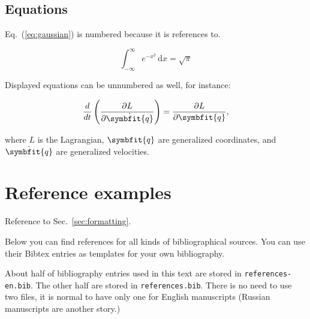 \documentclass[eqsecnum,authorsinfo]{kioj6}
\begin{document}
    \subsection{Equations}

    Eq.~(\ref{eq:gaussian}) is numbered because it is references to.
    
    \begin{equation}
        \int_{-\infty}^{\infty} e^{-x^2} \, \mathrm{d}x = \sqrt{\pi}
        \label{eq:gaussian}
    \end{equation}
    
    Displayed equations can be unnumbered as well, for instance:

    $$\frac{d}{dt} \left( \frac{\partial L}{\partial \dot{\symbfit{q}}} \right) = \frac{\partial L}{\partial \symbfit{q}},$$

    \noindent where $L$ is the Lagrangian, $\symbfit{q}$ are generalized coordinates, and $\dot{\symbfit{q}}$
    are generalized velocities.
    
    \section{Reference examples}
    Reference to Sec.~\ref{sec:formatting}.

    Below you can find references for all kinds of bibliographical sources. You can
    use their Bibtex entries as templates for your own bibliography.

    About half of bibliography entries used in this text are stored in  \texttt{references-en.bib}.
    The other half are stored in \texttt{references.bib}. There is no need to use two files,
    it is normal to have only one for English manuscripts (Russian manuscripts are another story.)
    
\end{document}
